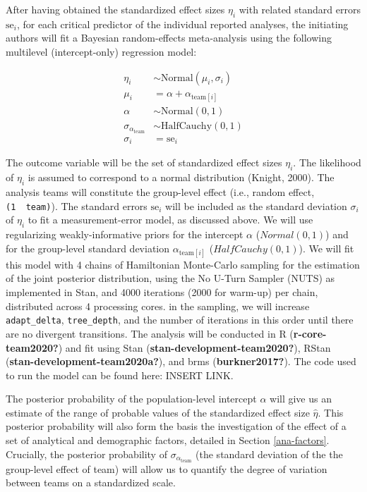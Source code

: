 \documentclass[
  english,
  man,floatsintext]{apa6}
\begin{document}
After having obtained the standardized effect sizes \(\eta_i\) with related standard errors \(\text{se}_i\), for each critical predictor of the individual reported analyses, the initiating authors will fit a Bayesian random-effects meta-analysis using the following multilevel (intercept-only) regression model:

\[
\begin{aligned}
\eta_i      & \sim \text{Normal}(\mu_i, \sigma_i) \\
\mu_i       & = \alpha + \alpha_{\text{team}[i]} \\
\alpha      & \sim \text{Normal}(0, 1) \\
\sigma_{\alpha_{\text{team}}} & \sim \text{HalfCauchy}(0, 1) \\
\sigma_i    & = \text{se}_i
\end{aligned}
\]

The outcome variable will be the set of standardized effect sizes \(\eta_i\).
The likelihood of \(\eta_i\) is assumed to correspond to a normal distribution (Knight, 2000).
The analysis teams will constitute the group-level effect (i.e., random effect, \texttt{(1\ \textbar{}\ team)}).
The standard errors \(\text{se}_i\) will be included as the standard deviation \(\sigma_i\) of \(\eta_i\) to fit a measurement-error model, as discussed above.
We will use regularizing weakly-informative priors for the intercept \(\alpha\) (\(Normal(0, 1)\)) and for the group-level standard deviation \(\alpha_{\text{team}[i]}\) (\(HalfCauchy(0, 1)\)).
We will fit this model with 4 chains of Hamiltonian Monte-Carlo sampling for the estimation of the joint posterior distribution, using the No U-Turn Sampler (NUTS) as implemented in Stan, and 4000 iterations (2000 for warm-up) per chain, distributed across 4 processing cores.
 in the sampling, we will increase \texttt{adapt\_delta}, \texttt{tree\_depth}, and the number of iterations in this order until there are no divergent transitions.
The analysis will be conducted in R (\textbf{r-core-team2020?}) and fit using Stan (\textbf{stan-development-team2020?}), RStan (\textbf{stan-development-team2020a?}), and brms (\textbf{burkner2017?}).
The code used to run the model can be found here: INSERT LINK.

The posterior probability of the population-level intercept \(\alpha\) will give us an estimate of the range of probable values of the standardized effect size \(\hat{\eta}\).
This posterior probability will also form the basis  the investigation of the effect of a set of analytical and demographic factors, detailed in Section \ref{ana-factors}.
Crucially, the posterior probability of \(\sigma_{\alpha_{\text{team}}}\) (the standard deviation of the the group-level effect of team) will allow us to quantify the degree of variation between teams on a standardized scale.
\end{document}
